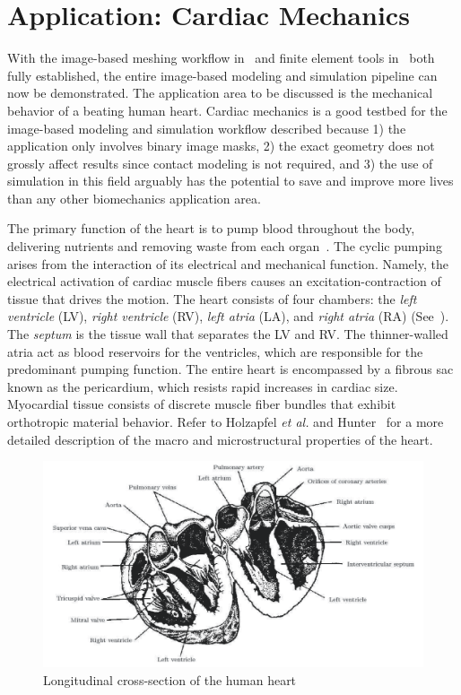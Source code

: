 \chapter{Application: Cardiac Mechanics}
\label{chap:5}
%
With the image-based meshing workflow in~ and finite element tools in~ both fully established, the entire image-based modeling and simulation pipeline can now be demonstrated. The application area to be discussed is the mechanical behavior of a beating human heart. Cardiac mechanics is a good testbed for the image-based modeling and simulation workflow described because 1) the application only involves binary image masks, 2) the exact geometry does not grossly affect results since contact modeling is not required, and 3) the use of simulation in this field arguably has the potential to save and improve more lives than any other biomechanics application area.

The primary function of the heart is to pump blood throughout the body, delivering nutrients and removing waste from each organ~\cite{holzapfel_2009}. The cyclic pumping arises from the interaction of its electrical and mechanical function. Namely, the electrical activation of cardiac muscle fibers causes an excitation-contraction of tissue that drives the motion. The heart consists of four chambers: the \textit{left ventricle} (LV), \textit{right ventricle} (RV), \textit{left atria} (LA), and \textit{right atria} (RA) (See~). The \textit{septum} is the tissue wall that separates the LV and RV. The thinner-walled atria act as blood reservoirs for the ventricles, which are responsible for the predominant pumping function. The entire heart is encompassed by a fibrous sac known as the pericardium, which resists rapid increases in cardiac size. Myocardial tissue consists of discrete muscle fiber bundles that exhibit orthotropic material behavior. Refer to Holzapfel \textit{et al.} and Hunter~\cite{holzapfel_2009} for a more detailed description of the macro and microstructural properties of the heart.

\begin{figure}[htbp!]
\centering
\includegraphics[width=1.0\textwidth]{media/anatomy.png}
\caption{Longitudinal cross-section of the human heart~\cite{katz_2015}}
\label{fig:anatomy}
\end{figure}

